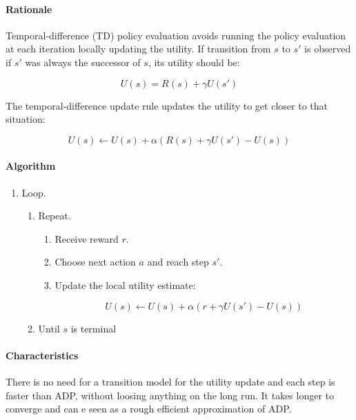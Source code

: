 			\paragraph{Rationale}
			Temporal-difference (TD) policy evaluation avoids running the policy evaluation at each iteration locally updating the utility.
			If transition from $s$ to $s'$ is observed if $s'$ was always the successor of $s$, its utility should be:
	
			$$U(s) = R(s) + \gamma U(s')$$
	
			The temporal-difference update rule updates the utility to get closer to that situation:
	
			$$U(s)\leftarrow U(s) + \alpha(R(s)+\gamma U(s')-U(s))$$
	
			\paragraph{Algorithm}
	
			\begin{enumerate}
				\item Loop.
	
					\begin{enumerate}
						\item Repeat.
	
							\begin{enumerate}
								\item Receive reward $r$.
								\item Choose next action $a$ and reach step $s'$.
								\item Update the local utility estimate:
			
									$$U(s)\leftarrow U(s) + \alpha(r+\gamma U(s')-U(s))$$
	
							\end{enumerate}
	
						\item Until $s$ is terminal
					\end{enumerate}
	
			\end{enumerate}
	
			\paragraph{Characteristics}
			There is no need for a transition model for the utility update and each step is faster than ADP, without loosing anything on the long run.
			It takes longer to converge and can e seen as a rough efficient approximation of ADP.

